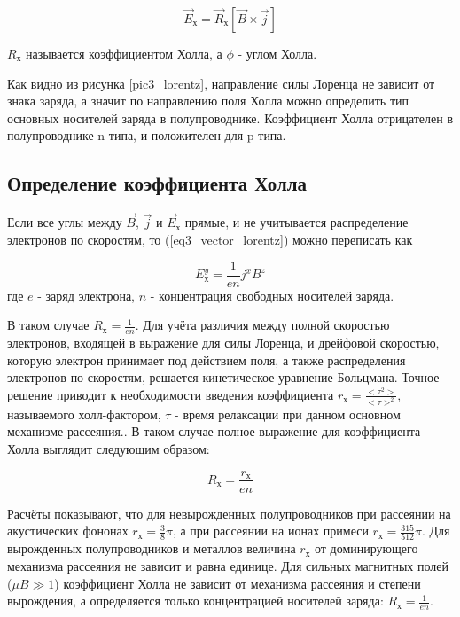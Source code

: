 \begin{equation}
\overrightarrow{E}_{\text{х}} = \overrightarrow{R}_{\text{х}} \left[ \overrightarrow{B} \times \overrightarrow{j} \right]
\label{eq3_vector_lorentz}
\end{equation}

$R_{\text{х}}$ называется коэффициентом Холла, а $\phi$ - углом Холла.

Как видно из рисунка \ref{pic3_lorentz}, направление силы Лоренца не зависит от знака заряда, а значит по направлению поля Холла можно определить тип основных носителей заряда в полупроводнике. Коэффициент Холла отрицателен в полупроводнике n-типа, и положителен для p-типа.

\subsection{Определение коэффициента Холла}

Если все углы между $\overrightarrow{B}$, $\overrightarrow{j}$ и $\overrightarrow{E}_{\text{х}}$ прямые, и не учитывается распределение электронов по скоростям, то (\ref{eq3_vector_lorentz}) можно переписать как

\begin{equation}
E^{y}_{\text{х}} = \frac{1}{e n} j^{x} B^{z}
\end{equation}
где $e$ - заряд электрона, $n$ - концентрация свободных носителей заряда.

В таком случае $R_{\text{х}} = \frac{1}{e n}$. Для учёта различия между полной скоростью электронов, входящей в выражение для силы Лоренца, и дрейфовой скоростью, которую электрон принимает под действием поля, а также распределения электронов по скоростям, решается кинетическое уравнение Больцмана. Точное решение приводит к необходимости введения коэффициента $r_{\text{х}} = \frac{<\tau^{2}>}{<\tau>^2}$, называемого холл-фактором, $\tau$ - время релаксации при данном основном механизме рассеяния.. В таком случае полное выражение для коэффициента Холла выглядит следующим образом:

\begin{equation}
R_{\text{х}} = \frac{r_{\text{х}}}{e n}
\end{equation}

Расчёты показывают, что для невырожденных полупроводников при рассеянии на акустических фононах $r_{\text{х}} = \frac{3}{8} \pi$, а при рассеянии на ионах примеси $r_{\text{х}} = \frac{315}{512} \pi$. Для вырожденных полупроводников и металлов величина $r_{\text{х}}$ от доминирующего механизма рассеяния не зависит и равна единице. Для сильных магнитных полей ($\mu B \gg 1$) коэффициент Холла не зависит от механизма рассеяния и степени вырождения, а определяется только концентрацией носителей заряда: $R_{\text{х}} = \frac{1}{e n}$.

